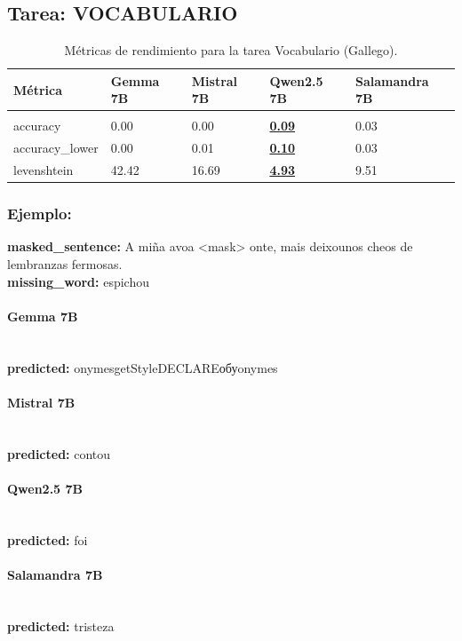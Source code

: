 \subsection{Tarea: VOCABULARIO}\label{tarea-vocabulario}
\begin{longtable}[]{@{}lllll@{}}
\toprule\noalign{}
Métrica & Gemma 7B & Mistral 7B & Qwen2.5 7B & Salamandra 7B \\
\midrule\noalign{}
\endhead
\bottomrule\noalign{}
\caption{Métricas de rendimiento para la tarea Vocabulario (Gallego).}
\label{tab:metricas_vocabulario_Gallego}\\
\endlastfoot
accuracy & 0.00 & 0.00 & \textbf{\underline{0.09}} & 0.03 \\
accuracy\_lower & 0.00 & 0.01 & \textbf{\underline{0.10}} & 0.03 \\
levenshtein & 42.42 & 16.69 & \textbf{\underline{4.93}} & 9.51 \\
\end{longtable}

\subsubsection{Ejemplo:}
\textbf{masked\_sentence:} A miña avoa {\textless}mask{\textgreater} onte, mais deixounos cheos de lembranzas fermosas.\\
\textbf{missing\_word:} espichou

\paragraph{Gemma 7B}~\\
\textbf{predicted:} onymesgetStyleDECLAREобуonymes

\paragraph{Mistral 7B}~\\
\textbf{predicted:} contou

\paragraph{Qwen2.5 7B}~\\
\textbf{predicted:} foi

\paragraph{Salamandra 7B}~\\
\textbf{predicted:} tristeza

